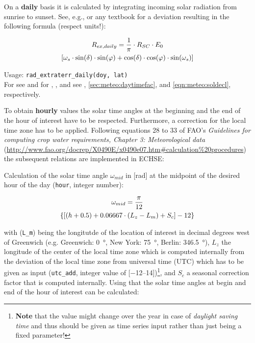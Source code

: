 On a \textbf{daily} basis it is calculated by integrating incoming solar radiation from sunrise to sunset. See, e.g., \citet{Neitsch2011} or any textbook for a deviation resulting in the following formula (respect units!):

\begin{multline}\label{eqn:meteo:radex_d}
R_{ex,daily}{} = \frac{1}{\pi} \cdot R_{SC}{} \cdot E_{0}{} \\
\left[ \omega_{s}{} \cdot \sin(\delta{}) \cdot \sin(\varphi{}) + \cos(\delta{}) \cdot \cos(\varphi{}) \cdot \sin(\omega_{s}{}) \right]
\end{multline}

\noindent
Usage:
\verb!rad_extraterr_daily(doy, lat)!
\\

For \solarConstant{} see  and for \eccCorr{}, \dayTimeFac{}, and \solDecl{} see , \ref{sec:meteo:daytimefac}, and \ref{eqn:meteo:soldecl}, respectively.

To obtain \textbf{hourly} values the solar time angles at the beginning and the end of the hour of interest have to be respected. Furthermore, a correction for the local time zone has to be applied. Following equations 28 to 33 of FAO's \emph{Guidelines for computing crop water requirements, Chapter 3: Meteorological data} (\url{http://www.fao.org/docrep/X0490E/x0490e07.htm#calculation\%20procedures}) the subsequent relations are implemented in ECHSE:

\noindent
Calculation of the solar time angle $\omega_{mid}$ in [\si{\radian}] at the midpoint of the desired hour of the day \hour{} (\verb!hour!, integer number):

\begin{multline}\label{eqn:meteo:radex_h:w_mid}
\omega_{mid} = \frac{\pi}{12} \\
\left\{ \left[ (h + 0.5) + 0.06667 \cdot (L_z - L_m) + S_c \right] - 12 \right\}
\end{multline}

\noindent
with \lon{} (\verb!L_m!) being the longitutde of the location of interest in decimal degrees west of Greenwich (e.g. Greenwich: \SI{0}{\degree}, New York: \SI{75}{\degree}, Berlin: \SI{346.5}{\degree}), $L_z$ the longitude of the center of the local time zone which is computed internally from the deviation of the local time zone from universal time (UTC) which has to be given as input (\verb!utc_add!, integer value of [\numrange[range-phrase=..]{-12}{14}])\footnote{\textbf{Note} that the value might change over the year in case of \emph{daylight saving time} and thus should be given as time series input rather than just being a fixed parameter!}, and $S_c$ a seasonal correction factor that is computed internally. Using that the solar time angles at begin and end of the hour of interest can be calculated:

